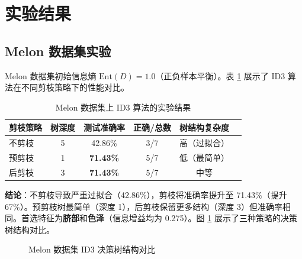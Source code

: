 \documentclass[UTF8]{ctexart}
\begin{document}
\section{实验结果}

\subsection{Melon 数据集实验}

Melon 数据集初始信息熵 $\text{Ent}(D) = 1.0$（正负样本平衡）。表 \ref{tab:melon_results} 展示了 ID3 算法在不同剪枝策略下的性能对比。

\begin{table}[H]
    \centering
    \caption{Melon 数据集上 ID3 算法的实验结果}
    \label{tab:melon_results}
    \begin{tabular}{lccccc}
    \toprule
    \textbf{剪枝策略} & \textbf{树深度} & \textbf{测试准确率} & \textbf{正确/总数} & \textbf{树结构复杂度} \\
    \midrule
    不剪枝 & 5 & 42.86\% & 3/7 & 高（过拟合） \\
    预剪枝 & 1 & \textbf{71.43\%} & 5/7 & 低（最简单） \\
    后剪枝 & 3 & \textbf{71.43\%} & 5/7 & 中等 \\
    \bottomrule
    \end{tabular}
\end{table}

\noindent \textbf{结论}：不剪枝导致严重过拟合（42.86\%），剪枝将准确率提升至 71.43\%（提升 67\%）。预剪枝树最简单（深度 1），后剪枝保留更多结构（深度 3）但准确率相同。首选特征为\textbf{脐部}和\textbf{色泽}（信息增益均为 0.275）。图 \ref{fig:melon_trees} 展示了三种策略的决策树结构对比。

\begin{figure}[H]
    \centering
    \hfill
    \hfill
    \caption{Melon 数据集 ID3 决策树结构对比}
    \label{fig:melon_trees}
\end{figure}
\end{document}
